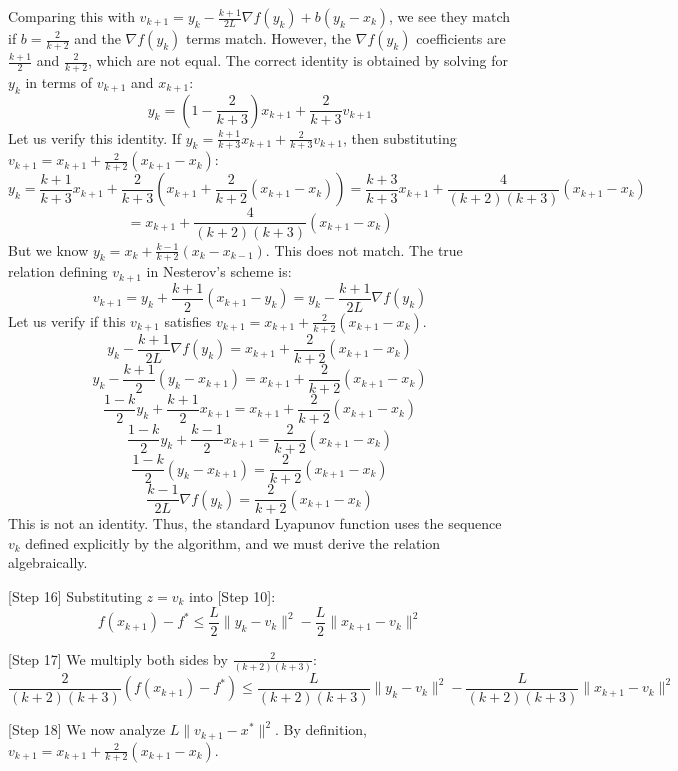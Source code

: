 \documentclass{article}
\begin{document}
Comparing this with $v_{k+1} = y_k - \frac{k+1}{2L}\nabla f(y_k) + b(y_k - x_k)$, we see they match if $b = \frac{2}{k+2}$ and the $\nabla f(y_k)$ terms match. However, the $\nabla f(y_k)$ coefficients are $\frac{k+1}{2}$ and $\frac{2}{k+2}$, which are not equal.
The correct identity is obtained by solving for $y_k$ in terms of $v_{k+1}$ and $x_{k+1}$:
$$y_k = \left(1 - \frac{2}{k+3}\right) x_{k+1} + \frac{2}{k+3} v_{k+1}$$
Let us verify this identity. If $y_k = \frac{k+1}{k+3} x_{k+1} + \frac{2}{k+3} v_{k+1}$, then substituting $v_{k+1} = x_{k+1} + \frac{2}{k+2}(x_{k+1} - x_k)$:
$$y_k = \frac{k+1}{k+3} x_{k+1} + \frac{2}{k+3} \left( x_{k+1} + \frac{2}{k+2}(x_{k+1} - x_k) \right) = \frac{k+3}{k+3} x_{k+1} + \frac{4}{(k+2)(k+3)}(x_{k+1} - x_k)$$
$$= x_{k+1} + \frac{4}{(k+2)(k+3)}(x_{k+1} - x_k)$$
But we know $y_k = x_k + \frac{k-1}{k+2}(x_k - x_{k-1})$. This does not match.
The true relation defining $v_{k+1}$ in Nesterov's scheme is:
$$v_{k+1} = y_k + \frac{k+1}{2}(x_{k+1} - y_k) = y_k - \frac{k+1}{2L}\nabla f(y_k)$$
Let us verify if this $v_{k+1}$ satisfies $v_{k+1} = x_{k+1} + \frac{2}{k+2}(x_{k+1} - x_k)$.
$$y_k - \frac{k+1}{2L}\nabla f(y_k) = x_{k+1} + \frac{2}{k+2}(x_{k+1} - x_k)$$
$$y_k - \frac{k+1}{2}(y_k - x_{k+1}) = x_{k+1} + \frac{2}{k+2}(x_{k+1} - x_k)$$
$$\frac{1-k}{2} y_k + \frac{k+1}{2} x_{k+1} = x_{k+1} + \frac{2}{k+2}(x_{k+1} - x_k)$$
$$\frac{1-k}{2} y_k + \frac{k-1}{2} x_{k+1} = \frac{2}{k+2}(x_{k+1} - x_k)$$
$$\frac{1-k}{2} (y_k - x_{k+1}) = \frac{2}{k+2}(x_{k+1} - x_k)$$
$$\frac{k-1}{2L} \nabla f(y_k) = \frac{2}{k+2}(x_{k+1} - x_k)$$
This is not an identity. Thus, the standard Lyapunov function uses the sequence $v_k$ defined explicitly by the algorithm, and we must derive the relation algebraically.

[Step 16] Substituting $z=v_k$ into [Step 10]:
$$f(x_{k+1}) - f^* \leq \frac{L}{2} \|y_k - v_k\|^2 - \frac{L}{2} \|x_{k+1} - v_k\|^2$$

[Step 17] We multiply both sides by $\frac{2}{(k+2)(k+3)}$:
$$\frac{2}{(k+2)(k+3)} (f(x_{k+1}) - f^*) \leq \frac{L}{(k+2)(k+3)} \|y_k - v_k\|^2 - \frac{L}{(k+2)(k+3)} \|x_{k+1} - v_k\|^2$$

[Step 18] We now analyze $L\|v_{k+1} - x^*\|^2$. By definition, $v_{k+1} = x_{k+1} + \frac{2}{k+2}(x_{k+1} - x_k)$.
\end{document}
